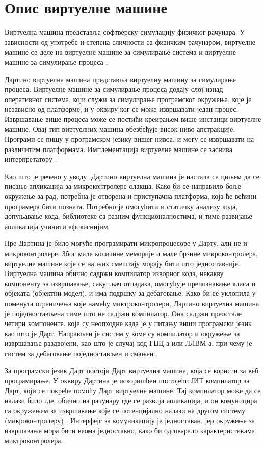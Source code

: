 \documentclass[12pt,oneside]{memoir}
\begin{document}
\section{Опис виртуелне машине}
\label{sec:opis}

Виртуелна машина представља софтверску симулацију физичког рачунара. У зависности од употребе и степена сличности са физичким рачунаром, виртуелне машине се деле на виртуелне машине за симулирање система и виртуелне машине за симулирање процеса \cite{virtuelna_masina}.

Дартино виртуелна машина представља виртуелну машину за симулирање процеса. Виртуелне машине за симулирање процеса додају слој изнад оперативног система, који служи за симулирање програмског окружења, које је независно од платформе, и у оквиру ког се може извршавати један процес. Извршавање више процеса може се постићи креирањем више инстанци виртуелне машине. Овај тип виртуелних машина обезбеђује висок ниво апстракције. Програми се пишу у програмском језику вишег нивоа, и могу се извршавати на различитим платформама. Имплементација виртуелне машине се заснива интерпретатору \cite{virtuelna_masina}.

Као што је речено у уводу, Дартино виртуелна машина је настала са циљем да се писање апликација за микроконтролере олакша. Како би се направило боље окружење за рад, потребна је отворена и приступачна платформа, која ће већини програмера бити позната. Потребно је омогућити и статичку анализу кода, допуњавање кода, библиотеке са разним функционалностима, и тиме развијање апликација учинити ефикаснијим.

Пре Дартина је било могуће програмирати микропроцесоре у Дарту, али не и микроконтролере. Због мале количине меморије и мале брзине микроконтролера, виртуелне машине које се на њих смештају морају бити што једноставније. Виртуелна машина обично садржи компилатор изворног кода, некакву компоненту за извршавање, сакупљач отпадака, омогућује препознавање класа и објеката (објектни модел), и има подршку за дебаговање. Како би се уклопила у поменута ограничења које намећу миктроконтролери, Дартино виртуелна машина је поједностављена тиме што не садржи компилатор. Она садржи преостале четири компоненте, које су неопходне када је у питању виши програмски језик као што је Дарт. Направљен је систем у коме су компилатор и окружење за извршавање раздвојени, као што је случај код ГЦЦ-а или ЛЛВМ-а, при чему је систем за дебаговање поједностављен и смањен \cite{Dartino}.

За програмски језик Дарт постоји Дарт виртуелна машина, која се користи за веб програмирање. У оквиру Дартина је искоришћен постојећи ЈИТ компилатор за Дарт, који се покреће помоћу Дарт виртуелне машине. Тај компилатор може да се налази било где, обично на рачунару где се развија апликација, и он комуницира са окружењем за извршавање које се потенцијално налази на другом систему (микроконтролеру) \cite{Dartino}. Интерфејс за комуникацију је једноставан, јер окружење за извршавање мора бити веома једноставно, како би одговарало карактеристикама миктроконтролера.
\end{document}
